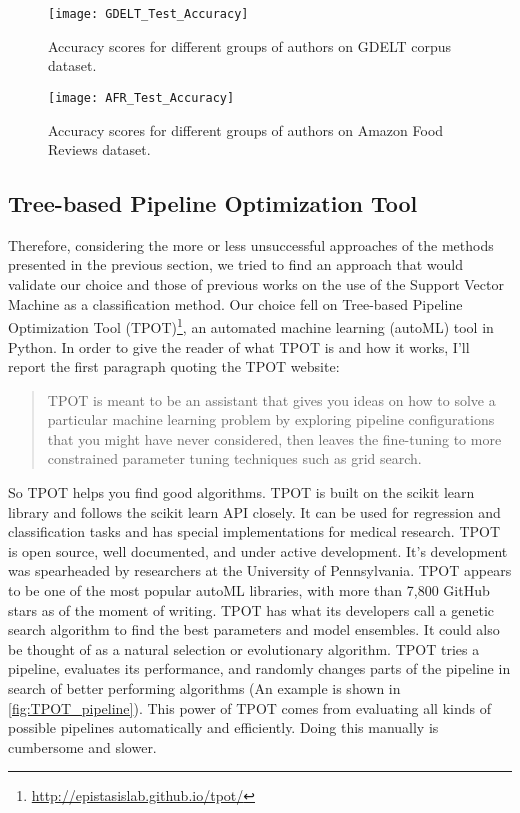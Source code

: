 \begin{figure}[ht]
	\centering
	\texttt{[image: GDELT\_Test\_Accuracy]}
	\caption[Methods performance on GDELT corpus]{Accuracy scores for different groups of authors on GDELT corpus dataset.}
	\label{fig:GDELT_methods_accuracy}
\end{figure}

\begin{figure}[ht]
	\centering
	\texttt{[image: AFR\_Test\_Accuracy]}
	\caption[Methods performance on Amazon Food Reviews dataset]{Accuracy scores for different groups of authors on Amazon Food Reviews dataset.}
	\label{fig:AFR_methods_accuracy}
\end{figure}

\subsection{Tree-based Pipeline Optimization Tool}
Therefore, considering the more or less unsuccessful approaches of the methods presented in the previous section, we tried to find an approach that would validate our choice and those of previous works on the use of the Support Vector Machine as a classification method.
Our choice fell on Tree-based Pipeline Optimization Tool (TPOT)\footnote{\url{http://epistasislab.github.io/tpot/}}, an automated machine learning (autoML) tool in Python.
In order to give the reader of what TPOT is and how it works, I'll report the first paragraph quoting the TPOT website:

\begin{quote}
	TPOT is meant to be an assistant that gives you ideas on how to solve a particular machine learning problem by exploring pipeline configurations that you might have never considered, then leaves the fine-tuning to more constrained parameter tuning techniques such as grid search.
\end{quote}
So TPOT helps you find good algorithms. TPOT is built on the scikit learn library and follows the scikit learn API closely. It can be used for regression and classification tasks and has special implementations for medical research.
TPOT is open source, well documented, and under active development. It’s development was spearheaded by researchers at the University of Pennsylvania. TPOT appears to be one of the most popular autoML libraries, with more than 7,800 GitHub stars as of the moment of writing.
TPOT has what its developers call a genetic search algorithm to find the best parameters and model ensembles. It could also be thought of as a natural selection or evolutionary algorithm. TPOT tries a pipeline, evaluates its performance, and randomly changes parts of the pipeline in search of better performing algorithms (An example is shown in \autoref{fig:TPOT_pipeline}).
This power of TPOT comes from evaluating all kinds of possible pipelines automatically and efficiently. Doing this manually is cumbersome and slower.

